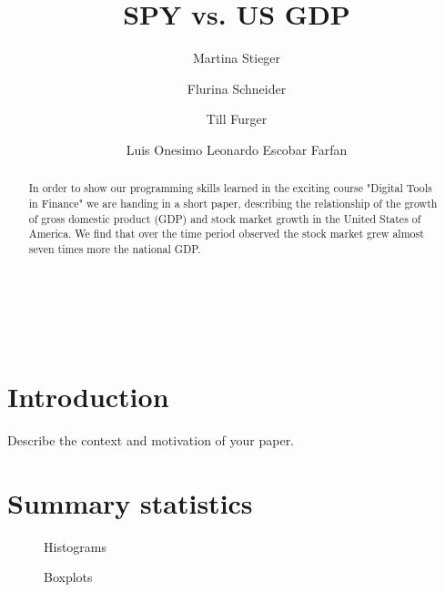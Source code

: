 \documentclass[12pt,a4paper,english]{article}
\title{SPY vs. US GDP}
\author[1]{Martina Stieger}
\author[1]{Flurina Schneider}
\author[1]{Till Furger}
\author[1]{Luis Onesimo Leonardo Escobar Farfan}
\affil[1]{University of Zurich, Plattenstrasse 14, 8032 Zurich, Switzerland}
\begin{document}

\maketitle

\begin{abstract} 
\noindent In order to show our programming skills learned in the exciting course "Digital Tools in Finance" we are
	handing in a short paper, describing the relationship of the growth of gross domestic product (GDP) and stock
	market growth in the United States of America. We find that over the time period observed the stock market grew
	almost seven times more the national GDP.
\end{abstract}

\hfill

\noindent{}\\
\noindent{}\\

\newpage


\tableofcontents
\listoffigures
\listoftables

\section{Introduction}
Describe the context and motivation of your paper.

\section{Summary statistics}

\begin{figure}[htbp]
	\centering
	
	\caption{Histograms}
\end{figure}

\begin{figure}[htbp]
	\centering
	
	\caption{Boxplots}
\end{figure}
\end{document}
